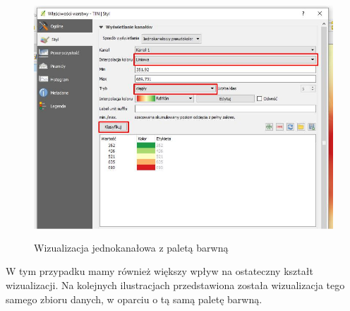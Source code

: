 \documentclass[12pt,a4paper]{book}
\begin{document}
\begin{figure}[ht]
	\centering
	\includegraphics[height=9.00cm]{007-raster-pseudo.jpg}
	\caption{Wizualizacja jednokanałowa z paletą barwną}
\end{figure}

W tym przypadku mamy również większy wpływ na ostateczny kształt wizualizacji. Na kolejnych ilustracjach przedstawiona została wizualizacja tego samego zbioru danych, w oparciu o tą samą paletę barwną.
\end{document}
